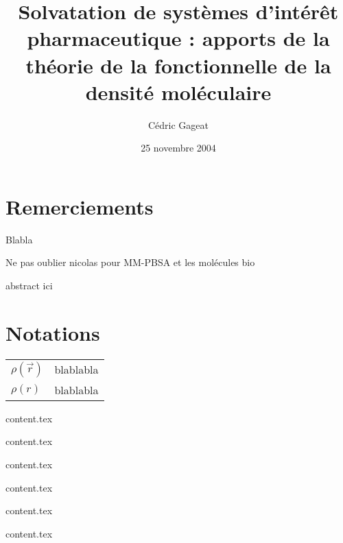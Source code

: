 \documentclass{bredele}
\title{Solvatation de systèmes d’intérêt pharmaceutique : apports de la théorie de la fonctionnelle de la densité moléculaire}
\author{Cédric Gageat}
\date{25 novembre 2004}
\begin{document}
\maketitle

\frontmatter
\chapter*{Remerciements}
Blabla

Ne pas oublier nicolas pour MM-PBSA et les molécules bio

\clearpage

abstract ici

\clearemptydoublepage



\renewcommand\contentsname{Sommaire}
\tableofcontents
 
 
\renewcommand{\cftdotsep}{\cftnodots}
\clearpage \newpage
\listoffigures
\clearpage \newpage
\listoftables


\clearemptydoublepage
\chapter*{Notations}
\thispagestyle{empty}
\begin{tabular}{ll}
$\rho(\vec{r})$ & blablabla \\
$\rho(r)$ & blablabla 
\end{tabular}




\clearemptydoublepage
\mainmatter


\clearemptydoublepage
{content.tex}


\clearemptydoublepage
{content.tex}


\clearemptydoublepage
{content.tex}


\clearemptydoublepage
{content.tex}


\clearemptydoublepage
{content.tex}


\clearemptydoublepage
{content.tex}




\clearemptydoublepage
\backmatter
\end{document}
